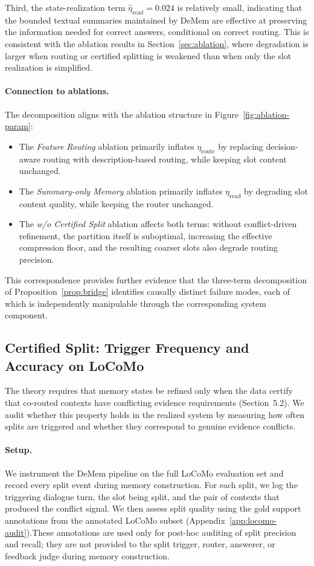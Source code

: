 \documentclass{article}
\theoremstyle{plain}
\theoremstyle{definition}
\theoremstyle{remark}
\begin{document}
Third, the state-realization term
\(\hat\eta_{\mathrm{read}}=0.024\) is relatively small, indicating that the
bounded textual summaries maintained by DeMem are effective at
preserving the information needed for correct answers, conditional on
correct routing. This is consistent with the ablation results in
Section~\ref{sec:ablation}, where degradation is larger when routing or
certified splitting is weakened than when only the slot realization is
simplified.

\paragraph{Connection to ablations.}
The decomposition aligns with the ablation structure in Figure~\ref{fig:ablation-param}:
\begin{itemize}[leftmargin=2em,itemsep=2pt]
    \item The \emph{Feature Routing} ablation primarily inflates $\eta_{\mathrm{route}}$ by replacing decision-aware routing with description-based routing, while keeping slot content unchanged.
    \item The \emph{Summary-only Memory} ablation primarily inflates $\eta_{\mathrm{read}}$ by degrading slot content quality, while keeping the router unchanged.
    \item The \emph{w/o Certified Split} ablation affects both terms: without conflict-driven refinement, the partition itself is suboptimal, increasing the effective compression floor, and the resulting coarser slots also degrade routing precision.
\end{itemize}
This correspondence provides further evidence that the three-term decomposition of Proposition~\ref{prop:bridge} identifies causally distinct failure modes, each of which is independently manipulable through the corresponding system component.

\subsection{Certified Split: Trigger Frequency and Accuracy on LoCoMo}
\label{app:split-audit}

The theory requires that memory states be refined only when the data
certify that co-routed contexts have conflicting evidence requirements
(Section~5.2). We audit whether this property holds in the realized
system by measuring how often splits are triggered and whether they
correspond to genuine evidence conflicts.

\paragraph{Setup.}
We instrument the DeMem pipeline on the full LoCoMo evaluation set and
record every split event during memory construction. For each split, we
log the triggering dialogue turn, the slot being split, and the pair of
contexts that produced the conflict signal. We then assess split quality
using the gold support annotations from the annotated LoCoMo subset
(Appendix~\ref{app:locomo-audit}).These annotations are used only for post-hoc auditing of split precision
and recall; they are not provided to the split trigger, router, answerer, or
feedback judge during memory construction.
\end{document}
